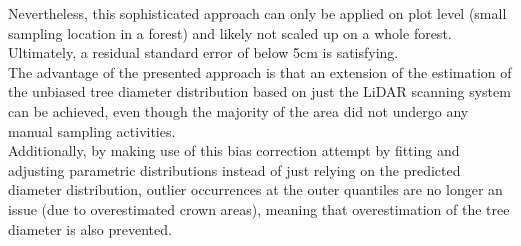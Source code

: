 Nevertheless, this sophisticated approach can only be applied on plot level (small sampling location in a forest) and likely not scaled up on a whole forest. Ultimately, a residual standard error of below 5cm is satisfying. \\

The advantage of the presented approach is that an extension of the estimation of the unbiased tree diameter distribution based on just the LiDAR scanning system can be achieved, even though the majority of the area did not undergo any manual sampling activities.\\
Additionally, by making use of this bias correction attempt by fitting and adjusting parametric distributions instead of just relying on the predicted diameter distribution, outlier occurrences at the outer quantiles are no longer an issue (due to overestimated crown areas), meaning that overestimation of the tree diameter is also prevented. 



